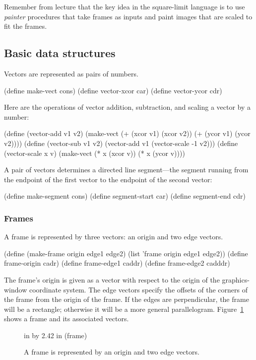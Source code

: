 \documentclass[11pt]{article}
\begin{document}
Remember from lecture that the key idea in the square-limit language
is to use {\em painter} procedures that take frames as inputs and
paint images that are scaled to fit the frames.

\subsection{Basic data structures}

Vectors are represented as pairs of numbers.

\beginlisp
(define make-vect cons)
(define vector-xcor car)
(define vector-ycor cdr)
\endlisp

Here are the operations of vector addition, subtraction, and scaling a
vector by a number:

\beginlisp
(define (vector-add v1 v2)
  (make-vect (+ (xcor v1) (xcor v2))
             (+ (ycor v1) (ycor v2))))
\null
(define (vector-sub v1 v2)
  (vector-add v1 (vector-scale -1 v2)))
\null
(define (vector-scale x v)
  (make-vect (* x (xcor v))
             (* x (ycor v))))
\endlisp

A pair of vectors determines a directed line segment---the segment
running from the endpoint of the first vector to the endpoint of the
second vector:

\beginlisp
(define make-segment cons)
(define segment-start car)
(define segment-end cdr)
\endlisp

\subsubsection{Frames}

A frame is represented by three vectors: an origin and two edge
vectors.

\beginlisp
(define (make-frame origin edge1 edge2)
  (list 'frame origin edge1 edge2))
\null
(define frame-origin cadr)
(define frame-edge1 caddr)
(define frame-edge2 cadddr)
\endlisp

The frame's origin is given as a vector with respect to the origin of
the graphics-window coordinate system.  The edge vectors specify the
offsets of the corners of the frame from the origin of the frame.  If
the edges are perpendicular, the frame will be a rectangle; otherwise
it will be a more general parallelogram.  Figure~\ref{frames} shows a
frame and its associated vectors.

\begin{figure}
 in by 2.42 in (frame)
\caption{{\protect\footnotesize A frame is represented by an origin
and two edge vectors.}}
\label{frames}
\end{figure} 
\end{document}
